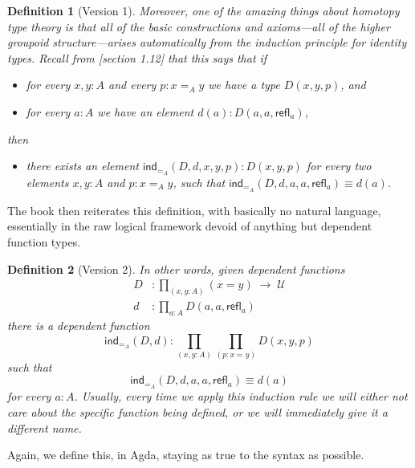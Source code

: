 \documentclass[11pt, a4paper]{article}
\newtheorem{definition}{Definition}
\newcommand{\jdeq}{\equiv}      %
\newcommand{\refl}[1]{\ensuremath{\mathsf{refl}_{#1}}\xspace}
\newcommand{\ind}[1]{\mathsf{ind}_{#1}}
\newcommand{\indid}[1]{\ind{=_{#1}}} %
\newcommand{\id}[3][]{\ensuremath{#2 =_{#1} #3}\xspace}
\newcommand{\UU}{\ensuremath{\mathcal{U}}\xspace}
\let\type\UU
\begin{document}
\begin{definition}[Version 1]

Moreover, one of the amazing things about homotopy type theory is that all of the basic constructions and axioms---all of the
higher groupoid structure---arises automatically from the induction
principle for identity types.
Recall from [section 1.12]  that this says that if %
  \begin{itemize}[noitemsep]
    \item for every $x,y:A$ and every $p:\id[A]xy$ we have a type $D(x,y,p)$, and
    \item for every $a:A$ we have an element $d(a):D(a,a,\refl a)$,
  \end{itemize}
then
  \begin{itemize}[noitemsep]
    \item there exists an element $\indid{A}(D,d,x,y,p):D(x,y,p)$ for \emph{every}
    two elements $x,y:A$ and $p:\id[A]xy$, such that $\indid{A}(D,d,a,a,\refl a)
    \jdeq d(a)$.
  \end{itemize}
\end{definition}
The book then reiterates this definition, with basically no natural language,
essentially in the raw logical framework devoid of anything but dependent
function types.
\begin{definition}[Version 2]
In other words, given dependent functions
\begin{align*}
  D & :\prod_{(x,y:A)}(x= y) \; \to \; \type\\
  d & :\prod_{a:A} D(a,a,\refl{a})
\end{align*}
there is a dependent function
\[\indid{A}(D,d):\prod_{(x,y:A)}\prod_{(p:\id{x}{y})} D(x,y,p)\]
such that
\begin{equation}\label{eq:Jconv}
\indid{A}(D,d,a,a,\refl{a})\jdeq d(a)
\end{equation}
for every $a:A$.
Usually, every time we apply this induction rule we will either not care about the specific function being defined, or we will immediately give it a different name.

\end{definition}
Again, we define this, in Agda, staying as true to the syntax as possible.
\end{document}
